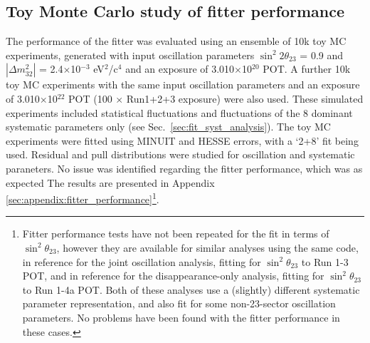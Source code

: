 \subsection {Toy Monte Carlo study of fitter performance}
\label{sec:toy_mc_fitter_performance}

The performance of the fitter was evaluated using an ensemble of 10k toy MC experiments, 
generated with input oscillation parameters $\sin^{2}2\theta_{23}$ = 0.9 and 
$|\Delta m^{2}_{32}|$ = 2.4$\times$10$^{-3}$ eV$^{2}$/c$^{4}$ and an exposure of 3.010$\times$10$^{20}$ POT.  
A further 10k toy MC experiments with the same input oscillation parameters and an exposure of
3.010$\times$10$^{22}$ POT (100 $\times$ Run1+2+3 exposure) were also used.
These simulated experiments included statistical fluctuations and fluctuations of the 8 dominant systematic 
parameters only (see Sec.\ \ref{sec:fit_syst_analysis}). 
The toy MC experiments were fitted using MINUIT and HESSE errors, with a `2+8' fit being used. 
Residual and pull distributions were studied for oscillation and systematic paraneters.
No issue was identified regarding the fitter performance, which was as expected
The results are presented in Appendix \ref{sec:appendix:fitter_performance}\footnote{
  Fitter performance tests have not been repeated for the fit in terms of $\sin^2\theta_{23}$,
  however they are available for similar analyses using the same code,
  in reference \cite{OurRun123JointOscillationAnalysis} for the joint oscillation analysis,
  fitting for $\sin^2\theta_{23}$ to Run 1-3 POT,
  and in reference \cite{OurRun1234aDisappAnalysis3Flavour} for the
  disappearance-only analysis, fitting for $\sin^2\theta_{23}$ to Run 1-4a POT.
  Both of these analyses use a (slightly) different systematic parameter representation,
  and also fit for some non-23-sector oscillation parameters.
  No problems have been found with the fitter performance in these cases.
}.

